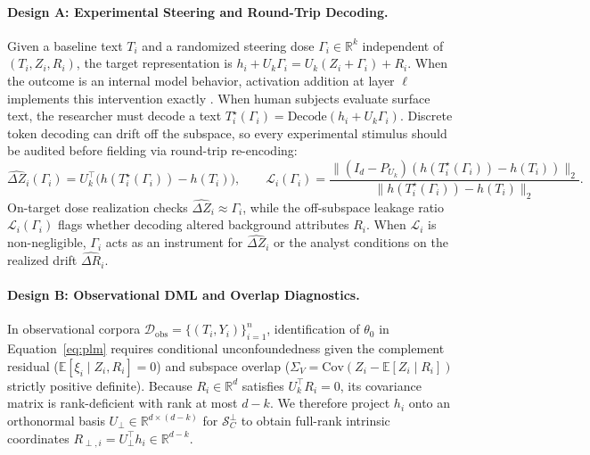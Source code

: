 \documentclass[11pt]{article}
\begin{document}
\paragraph{Design A: Experimental Steering and Round-Trip Decoding.} Given a baseline text $T_i$ and a randomized steering dose $\Gamma_i \in \mathbb{R}^k$ independent of $(T_i, Z_i, R_i)$, the target representation is $h_i + U_k \Gamma_i = U_k(Z_i + \Gamma_i) + R_i$. When the outcome is an internal model behavior, activation addition at layer $\ell$ implements this intervention exactly \citep{turner2023activation,li2023inference}. When human subjects evaluate surface text, the researcher must decode a text $T_i^\star(\Gamma_i) = \mathrm{Decode}(h_i + U_k \Gamma_i)$. Discrete token decoding can drift off the subspace, so every experimental stimulus should be audited before fielding via round-trip re-encoding:
\begin{equation}\label{eq:round_trip}
\widehat{\Delta Z}_i(\Gamma_i) = U_k^\top\big(h(T_i^\star(\Gamma_i)) - h(T_i)\big), \qquad \mathcal{L}_i(\Gamma_i) = \frac{\|(I_d - P_{U_k})(h(T_i^\star(\Gamma_i)) - h(T_i))\|_2}{\|h(T_i^\star(\Gamma_i)) - h(T_i)\|_2}.
\end{equation}
On-target dose realization checks $\widehat{\Delta Z}_i \approx \Gamma_i$, while the off-subspace leakage ratio $\mathcal{L}_i(\Gamma_i)$ flags whether decoding altered background attributes $R_i$. When $\mathcal{L}_i$ is non-negligible, $\Gamma_i$ acts as an instrument for $\widehat{\Delta Z}_i$ or the analyst conditions on the realized drift $\widehat{\Delta R}_i$.

\paragraph{Design B: Observational DML and Overlap Diagnostics.} In observational corpora $\mathcal{D}_{\mathrm{obs}} = \{(T_i, Y_i)\}_{i=1}^n$, identification of $\theta_0$ in Equation~\eqref{eq:plm} requires conditional unconfoundedness given the complement residual ($\mathbb{E}[\xi_i \mid Z_i, R_i] = 0$) and subspace overlap ($\Sigma_V = \mathrm{Cov}(Z_i - \mathbb{E}[Z_i \mid R_i])$ strictly positive definite). Because $R_i \in \mathbb{R}^d$ satisfies $U_k^\top R_i = 0$, its covariance matrix is rank-deficient with rank at most $d - k$. We therefore project $h_i$ onto an orthonormal basis $U_\perp \in \mathbb{R}^{d \times (d-k)}$ for $\mathcal{S}_C^\perp$ to obtain full-rank intrinsic coordinates $R_{\perp, i} = U_\perp^\top h_i \in \mathbb{R}^{d-k}$.
\end{document}
